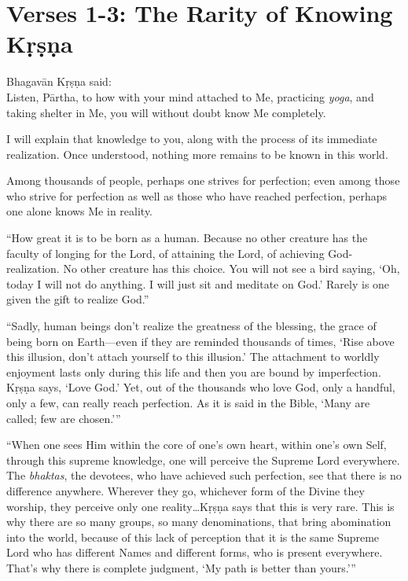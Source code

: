 \section{Verses 1-3: The Rarity of Knowing Kṛṣṇa}\label{sec-verses-1-3-the-rarity-of-knowing-krsna}

{\hspace*{1em}Bhagavān Kṛṣṇa said: \\
Listen, Pārtha, to how with your mind attached to Me, practicing \textit{yoga}, and taking shelter in Me, you will without doubt know Me completely.}

{I will explain that knowledge to you, along with the process of its immediate realization. Once understood, nothing more remains to be known in this world.}

{Among thousands of people, perhaps one strives for perfection; even among those who strive for perfection as well as those who have reached perfection, perhaps one alone knows Me in reality.}

\enquote{How great it is to be born as a human. Because no other creature has the faculty of longing for the Lord, of attaining the Lord, of achieving God-realization. No other creature has this choice. You will not see a bird saying, \enquote{Oh, today I will not do anything. I will just sit and meditate on God.} Rarely is one given the gift to realize God.}

\enquote{Sadly, human beings don’t realize the greatness of the blessing, the grace of being born on Earth---even if they are reminded thousands of times, \enquote{Rise above this illusion, don’t attach yourself to this illusion.} The attachment to worldly enjoyment lasts only during this life and then you are bound by imperfection. Kṛṣṇa says, \enquote{Love God.} Yet, out of the thousands who love God, only a handful, only a few, can really reach perfection. As it is said in the Bible, \enquote{Many are called; few are chosen.}}

\enquote{When one sees Him within the core of one’s own heart, within one’s own Self, through this supreme knowledge, one will perceive the Supreme Lord everywhere. The \textit{bhaktas}, the devotees, who have achieved such perfection, see that there is no difference anywhere. Wherever they go, whichever form of the Divine they worship, they perceive only one reality\ldots Kṛṣṇa says that this is very rare. This is why there are so many groups, so many denominations, that bring abomination into the world, because of this lack of perception that it is the same Supreme Lord who has different Names and different forms, who is present everywhere. That’s why there is complete judgment, \enquote{My path is better than yours.}}

